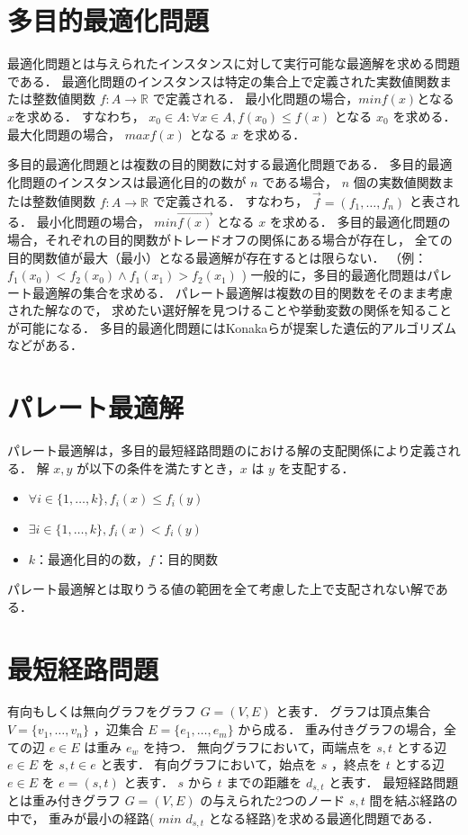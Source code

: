 \documentclass[12pt]{optlab-bachelor}
\begin{document}
\section{多目的最適化問題}
最適化問題とは与えられたインスタンスに対して実行可能な最適解を求める問題である．
最適化問題のインスタンスは特定の集合上で定義された実数値関数または整数値関数
$f : A \rightarrow \mathbb{R}$ で定義される．
最小化問題の場合，$minf(x)$となる$x$を求める．
すなわち， $x_0 \in A : \forall x\in A , f(x_0) \leq f(x) $ となる $x_0$ を求める．
最大化問題の場合， $maxf(x)$ となる $x$ を求める．

多目的最適化問題とは複数の目的関数に対する最適化問題である．
多目的最適化問題のインスタンスは最適化目的の数が $n$ である場合，
 $n$ 個の実数値関数または整数値関数 $f : A \rightarrow \mathbb{R}$ で定義される．
すなわち， $\vec{f} = (f_1 , \ldots , f_n)$ と表される．
最小化問題の場合， $min\vec{f(x)}$ となる $x$ を求める．
多目的最適化問題の場合，それぞれの目的関数がトレードオフの関係にある場合が存在し，
全ての目的関数値が最大（最小）となる最適解が存在するとは限らない．
（例： $f_1(x_0) < f_2(x_0) \land f_1(x_1) > f_2(x_1)$ )
一般的に，多目的最適化問題はパレート最適解の集合を求める．
パレート最適解は複数の目的関数をそのまま考慮された解なので，
求めたい選好解を見つけることや挙動変数の関係を知ることが可能になる．
多目的最適化問題にはKonakaら\cite{Konaka}が提案した遺伝的アルゴリズムなどがある．

\section{パレート最適解}
パレート最適解は，多目的最短経路問題のにおける解の支配関係により定義される．
解 $x,y$ が以下の条件を満たすとき，$x$ は $y$ を支配する．
\begin{itemize}
\item $\forall i \in \{1,\ldots,k\},f_i(x) \le f_i(y)$
\item $\exists i \in \{1,\ldots,k\},f_i(x) < f_i(y)$
\item $k$：最適化目的の数，$f$：目的関数
\end{itemize}
パレート最適解とは取りうる値の範囲を全て考慮した上で支配されない解である．

\section{最短経路問題}
有向もしくは無向グラフをグラフ $G=(V,E)$ と表す．
グラフは頂点集合 $V=\{v_1,\ldots,v_n\}$ ，辺集合 $E=\{e_1,\ldots,e_m\}$ から成る．
重み付きグラフの場合，全ての辺 $e\in E$ は重み $e_w$ を持つ．
無向グラフにおいて，両端点を $s,t$ とする辺 $e \in E$ を $s,t \in e$ と表す．
有向グラフにおいて，始点を $s$ ，終点を $t$ とする辺 $e \in E$ を $e=(s,t)$ と表す．
 $s$ から $t$ までの距離を $d_{s,t}$ と表す．
最短経路問題とは重み付きグラフ $G=(V,E)$ の与えられた2つのノード $s,t$ 間を結ぶ経路の中で，
重みが最小の経路( $min$ $d_{s,t}$ となる経路)を求める最適化問題である．
\end{document}
